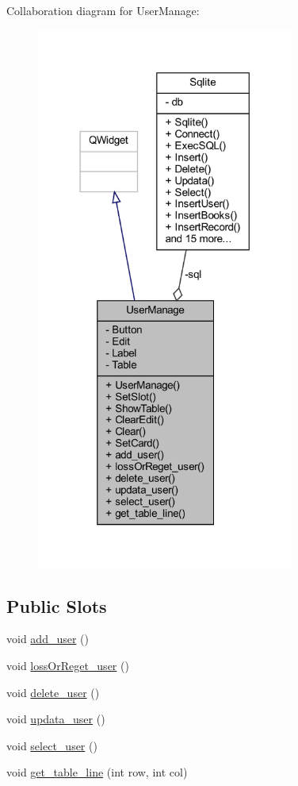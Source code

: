 Collaboration diagram for User\+Manage\+:
\nopagebreak
\begin{figure}[H]
\begin{center}
\leavevmode
\includegraphics[width=240pt]{class_user_manage__coll__graph}
\end{center}
\end{figure}
\subsection*{Public Slots}
\begin{DoxyCompactItemize}
\item 
void \mbox{\hyperlink{class_user_manage_a7058bbb981e4c6b3064c3e5e334ac700}{add\+\_\+user}} ()
\item 
void \mbox{\hyperlink{class_user_manage_a82a9b76e62d1d7383e264019066082b8}{loss\+Or\+Reget\+\_\+user}} ()
\item 
void \mbox{\hyperlink{class_user_manage_a254765c27c79b94370dd9f1e44551355}{delete\+\_\+user}} ()
\item 
void \mbox{\hyperlink{class_user_manage_ab7f81e5e1f3d9944c551401dba37693f}{updata\+\_\+user}} ()
\item 
void \mbox{\hyperlink{class_user_manage_aa6252c8286f24959ec4b938054328bf7}{select\+\_\+user}} ()
\item 
void \mbox{\hyperlink{class_user_manage_acf5b626b21868282ff4ad9dcccf8c765}{get\+\_\+table\+\_\+line}} (int row, int col)
\end{DoxyCompactItemize}
